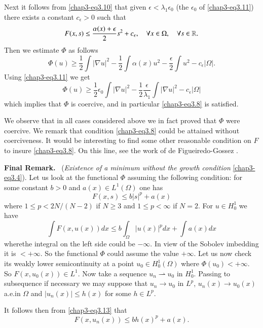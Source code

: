 \begin{remarks*}
\begin{enumerate}
Next it follows from \eqref{chap3-eq3.10} that given
$\epsilon<\lambda_{1}\epsilon_{0}$ (the $\epsilon_{0}$ of
\eqref{chap3-eq3.11}) there exists a constant $c_{\epsilon}>0$ such
that
$$
F(x,s)\leq \frac{\alpha(x)+\epsilon}{2}s^{2}+c_{\epsilon},\quad \forall
x\in \Omega,\quad \forall s\in \mathbb{R}.
$$
Then we estimate $\Phi$ as follows
$$
\Phi(u)\geq \frac{1}{2}\int |\nabla u|^{2}-\frac{1}{2}\int
\alpha(x)u^{2}-\frac{\epsilon}{2}\int u^{2}-c_{\epsilon}|\Omega|.
$$
Using \eqref{chap3-eq3.11} we get
$$
\Phi(u)\geq \frac{1}{2}\epsilon_{0}\int |\nabla
u|^{2}-\frac{1}{2}\frac{\epsilon}{\lambda_{1}}\int |\nabla
u|^{2}-c_{\epsilon}|\Omega| 
$$
which implies that $\Phi$ is coercive, and in particular
\eqref{chap3-eq3.8} is satisfied.
\end{enumerate}
\end{remarks*}

\begin{remark*}
We observe that in all cases considered above we in fact pro\-ved that
$\Phi$ were coercive. We remark that condition \eqref{chap3-eq3.8}
could be attained without coerciveness. It would be interesting to
find some other reasonable condition on $F$ to insure
\eqref{chap3-eq3.8}. On this line, see the work of de
Figueiredo-Gossez \cite{key42}.
\end{remark*}

\noindent
{\bf Final Remark.}~ ({\em Existence of a minimum without the growth
  condition} \eqref{chap3-eq3.4}). Let us look at the functional
$\Phi$ assuming the following condition: for some constant $b>0$ and
$a(x)\in L^{1}(\Omega)$ one has
\begin{equation*}
F(x,s)\leq b|s|^{p}+a(x)\tag{3.13}\label{chap3-eq3.13}
\end{equation*}
where $1\leq p<2N/(N-2)$ if $N\geq 3$ and $1\leq p<\infty$ if
$N=2$. For $u\in H^{1}_{0}$ we have
$$
\int F(x,u(x))dx\leq b\int_{\Omega}|u(x)|^{p}dx+\int a(x)dx
$$
where\pageoriginale the integral on the left side could be
$-\infty$. In view of the Sobolev imbedding it is $<+\infty$. So the
functional $\Phi$ could assume the value $+\infty$. Let us now check
its weakly lower semicontinuity at a point $u_{0}\in
H^{1}_{0}(\Omega)$ where $\Phi(u_{0})<+\infty$. So $F(x,u_{0}(x))\in
L^{1}$. Now take a sequence $u_{n}\rightharpoonup u_{0}$ in
$H^{1}_{0}$. Passing to subsequence if necessary we may suppose that
$u_{n}\to u_{0}$ in $L^{p}$, $u_{n}(x)\to u_{0}(x)$ a.e.\@ in $\Omega$
and $|u_{n}(x)|\leq h(x)$ for some $h\in L^{p}$.

It follows then from \eqref{chap3-eq3.13} that
$$
F(x,u_{n}(x))\leq bh(x)^{p}+a(x).
$$

